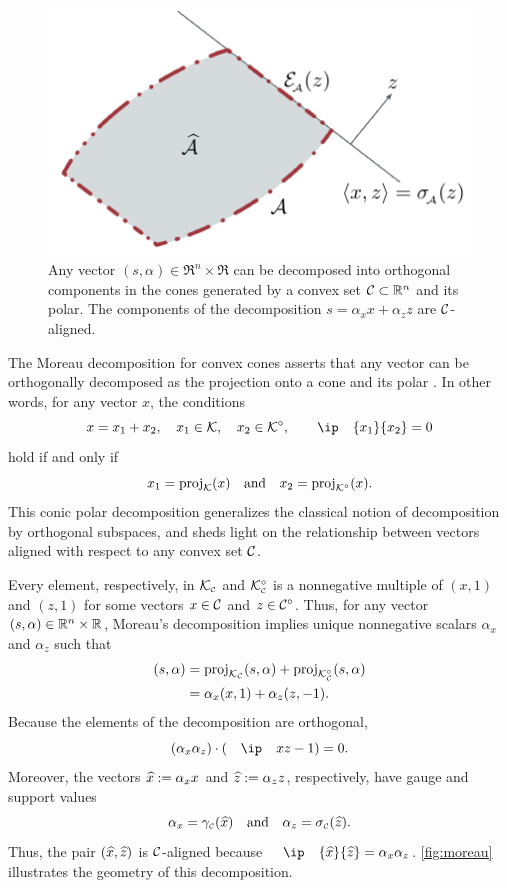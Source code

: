\begin{figure}[t]
  \centering
  \includegraphics[page=8]{./figures/illustrations}
  \caption{Any vector $(s,\alpha)\in\Re^{n}\times\Re$ can be
    decomposed into orthogonal components in the cones generated by
    a convex set $\mathcal{C}\subset\mathbb{R}^n$ and its polar. The components
    of the decomposition $s=\alpha_xx+\alpha_zz$ are
    $\mathcal{C}$-aligned.}
  \label{fig:moreau}
\end{figure}

The Moreau decomposition for convex cones asserts that any vector can be
orthogonally decomposed as the projection onto a cone and its polar
\citep[Theorem~3.2.5]{hiriart-urruty01}. In other words, for any vector $x$, the
conditions
\[
  x = x_1 + x_2, \quad x_1\in\Kscr, \quad x_2\in\Kscr\polar, \quad \ip{x_1}{x_2} = 0
\]
hold if and only if
\[
  x_1 = \operatorname{proj}_{\mathcal{K}}(x) \hbox{\quad and\quad} x_2 = \operatorname{proj}_{\mathcal{K}^\circ}(x).
\]
This conic polar decomposition generalizes the classical notion of decomposition
by orthogonal subspaces, and sheds light on the relationship between vectors
aligned with respect to any convex set $\mathcal{C}$.

Every element, respectively, in $\mathcal{K}_{\scriptscriptstyle\mathcal{C}}$ and $\mathcal{K}_{\scriptscriptstyle\mathcal{C}}^\circ$ is a
nonnegative multiple of $(x,1)$ and $(z,1)$ for some vectors
$x\in\mathcal{C}$ and $z\in\mathcal{C}^\circ$. Thus, for any vector
$(s,\alpha)\in\mathbb{R}^n\times\mathbb{R}$, Moreau's decomposition implies
unique nonnegative scalars $\alpha_x$ and $\alpha_z$ such that
\begin{align*}
  (s,\alpha)
    &= \operatorname{proj}_{\mathcal{K}_{\scriptscriptstyle\mathcal{C}}}(s,\alpha) + \operatorname{proj}_{\mathcal{K}_{\scriptscriptstyle\mathcal{C}}^\circ}(s,\alpha)
  \\&= \alpha_x (x,1) + \alpha_z(z,-1).
\end{align*}
Because the elements of the decomposition are orthogonal,
\[
  (\alpha_x \alpha_z)\cdot(\ip x z - 1) = 0.
\]
Moreover, the vectors $\xhat := \alpha_x x$ and $\zhat:=\alpha_z z$,
respectively, have gauge and support values
\[
  \alpha_x = \gauge\Cs(\xhat) \text{and} \alpha_z = \sigma\Cs(\zhat).
\]
Thus, the pair $(\xhat,\zhat)$ is $\mathcal{C}$-aligned because $\ip{\xhat}{\zhat} =
\alpha_x\alpha_z$. \autoref{fig:moreau} illustrates the geometry of this decomposition.



